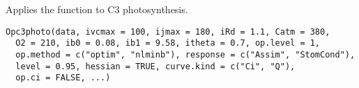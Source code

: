 \documentclass[letterpaper]{book}
\begin{document}
%
\begin{Description}\relax
Applies the  function to C3 photosynthesis.
\end{Description}
%
\begin{Usage}
\begin{verbatim}
Opc3photo(data, ivcmax = 100, ijmax = 180, iRd = 1.1, Catm = 380,
  O2 = 210, ib0 = 0.08, ib1 = 9.58, itheta = 0.7, op.level = 1,
  op.method = c("optim", "nlminb"), response = c("Assim", "StomCond"),
  level = 0.95, hessian = TRUE, curve.kind = c("Ci", "Q"),
  op.ci = FALSE, ...)
\end{verbatim}
\end{Usage}
%
\end{document}
